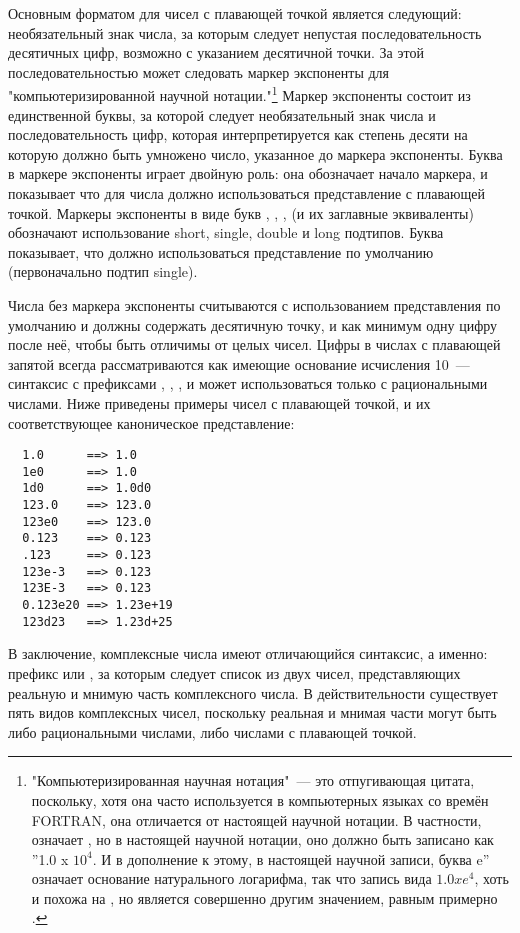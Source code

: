 Основным форматом для чисел с плавающей точкой является следующий: необязательный знак
числа, за которым следует непустая последовательность десятичных цифр, возможно с
указанием десятичной точки.  За этой последовательностью может следовать маркер экспоненты
для "компьютеризированной научной нотации."\footnote{"Компьютеризированная научная
  нотация"~--- это отпугивающая цитата, поскольку, хотя она часто используется в
  компьютерных языках со времён FORTRAN, она отличается от настоящей научной нотации.  В
  частности,  означает , но в настоящей научной нотации, оно
  должно быть записано как ''1.0 x $10^4$.  И в дополнение к этому, в настоящей научной
  записи, буква e'' означает основание натурального логарифма, так что запись вида $1.0 x
  e^4$, хоть и похожа на , но является совершенно другим значением, равным
  примерно .}  Маркер экспоненты состоит из единственной буквы, за которой
следует необязательный знак числа и последовательность цифр, которая интерпретируется как
степень десяти на которую должно быть умножено число, указанное до маркера экспоненты.
Буква в маркере экспоненты играет двойную роль: она обозначает начало маркера, и
показывает что для числа должно использоваться представление с плавающей точкой.  Маркеры
экспоненты в виде букв , , ,  (и их заглавные эквиваленты)
обозначают использование short, single, double и long подтипов.  Буква 
показывает, что должно использоваться представление по умолчанию (первоначально подтип
single).

Числа без маркера экспоненты считываются с использованием представления по умолчанию и
должны содержать десятичную точку, и как минимум одну цифру после неё, чтобы быть отличимы
от целых чисел.  Цифры в числах с плавающей запятой всегда рассматриваются как имеющие
основание исчисления 10~--- синтаксис с префиксами , , , и
 может использоваться только с рациональными числами.  Ниже приведены примеры
чисел с плавающей точкой, и их соответствующее каноническое представление:

\begin{verbatim}
  1.0      ==> 1.0
  1e0      ==> 1.0
  1d0      ==> 1.0d0
  123.0    ==> 123.0
  123e0    ==> 123.0
  0.123    ==> 0.123
  .123     ==> 0.123
  123e-3   ==> 0.123
  123E-3   ==> 0.123
  0.123e20 ==> 1.23e+19
  123d23   ==> 1.23d+25
\end{verbatim}

В заключение, комплексные числа имеют отличающийся синтаксис, а именно: префикс 
или , за которым следует список из двух чисел, представляющих реальную и мнимую
часть комплексного числа.  В действительности существует пять видов комплексных чисел,
поскольку реальная и мнимая части могут быть либо рациональными числами, либо числами с
плавающей точкой.

